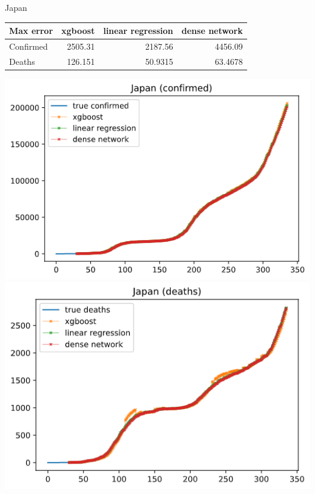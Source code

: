 \documentclass[a4paper,12pt]{article}
\begin{document}
\begin{tcolorbox}
    Japan
    \begin{tabular}{lrrr}
    \toprule
    Max error   &   xgboost &   linear regression &   dense network \\
    \midrule
    Confirmed   &  2505.31  &           2187.56   &       4456.09   \\
    Deaths      &   126.151 &             50.9315 &         63.4678 \\
    \bottomrule
    \end{tabular}

    \begin{center}
        \includegraphics[width=\textwidth]{Japan_4-1.png}
        \includegraphics[width=\textwidth]{Japan_4-2.png}
    \end{center}
\end{tcolorbox}
\end{document}
